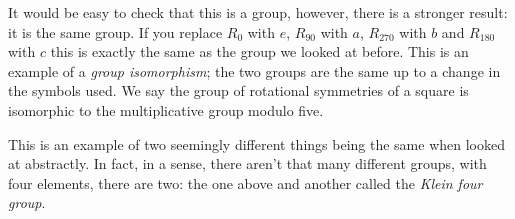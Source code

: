 \documentclass[12pt]{article}
\begin{document}
It would be easy to check that this is a group, however, there is a
stronger result: it is the same group. If you replace $R_0$ with $e$,
$R_{90}$ with $a$, $R_{270}$ with $b$ and $R_{180}$ with $c$ this is
exactly the same as the group we looked at before. This is an example
of a \textsl{group isomorphism}; the two groups are the same up to a
change in the symbols used. We say the group of rotational symmetries
of a square is isomorphic to the multiplicative group modulo five.

This is an example of two seemingly different things being the same when looked at abstractly. In fact, in a sense, there aren't that many different groups, with four elements, there are two: the one above and another called the \textsl{Klein four group}\HandLeft.
\end{document}
